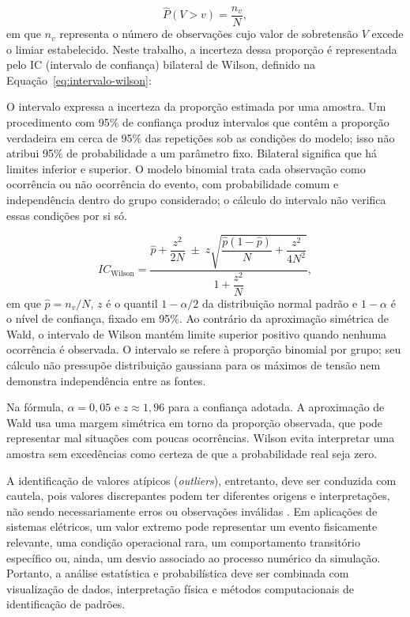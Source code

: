 \documentclass[
	12pt,				%
	openright,			%
	oneside,			%
	a4paper,			%
	chapter=TITLE,		%
	section=TITLE,		%
	subsection=TITLE,	%
	subsubsection=TITLE,%
	english,			%
	brazilian			%
	]{abntex2}
\theoremstyle{definition}
\begin{document}
\begin{equation}
\label{eq:excedencia-empirica}
\hat{P}(V > v)=\frac{n_v}{N},
\end{equation}
em que $n_v$ representa o número de observações cujo valor de sobretensão
$V$ excede o limiar estabelecido. Neste trabalho, a incerteza dessa
proporção é representada pelo IC (intervalo de confiança) bilateral de Wilson, definido na
Equação~\ref{eq:intervalo-wilson}:

O intervalo expressa a incerteza da proporção estimada por uma amostra.
Um procedimento com 95\% de confiança produz intervalos que contêm a
proporção verdadeira em cerca de 95\% das repetições sob as condições
do modelo; isso não atribui 95\% de probabilidade a um parâmetro fixo.
Bilateral significa que há limites inferior e superior. O modelo binomial
trata cada observação como ocorrência ou não ocorrência do evento,
com probabilidade comum e independência dentro do grupo considerado;
o cálculo do intervalo não verifica essas condições por si só.

\begin{equation}
\label{eq:intervalo-wilson}
IC_{\mathrm{Wilson}} =
\frac{\hat{p}+\dfrac{z^2}{2N}
\;\pm\; z\sqrt{\dfrac{\hat{p}(1-\hat{p})}{N}
+\dfrac{z^2}{4N^2}}}{1+\dfrac{z^2}{N}},
\end{equation}
em que $\hat{p}=n_v/N$, $z$ é o quantil $1-\alpha/2$ da distribuição
normal padrão e $1-\alpha$ é o nível de confiança, fixado em 95\%.
Ao contrário da aproximação simétrica de Wald, o intervalo de Wilson
mantém limite superior positivo quando nenhuma ocorrência é observada.
O intervalo se refere à proporção binomial por grupo; seu cálculo não
pressupõe distribuição gaussiana para os máximos de tensão nem demonstra
independência entre as fontes.

Na fórmula, $\alpha=0{,}05$ e $z\approx1{,}96$ para a confiança adotada.
A aproximação de Wald usa uma margem simétrica em torno da proporção
observada, que pode representar mal situações com poucas ocorrências.
Wilson evita interpretar uma amostra sem excedências como certeza de
que a probabilidade real seja zero.

A identificação de valores atípicos (\textit{outliers}), entretanto, deve ser conduzida com cautela, pois valores discrepantes podem ter diferentes origens e interpretações, não sendo necessariamente erros ou observações inválidas \cite{barnett1994}. Em aplicações de sistemas elétricos, um valor extremo pode representar um evento fisicamente relevante, uma condição operacional rara, um comportamento transitório específico ou, ainda, um desvio associado ao processo numérico da simulação. Portanto, a análise estatística e probabilística deve ser combinada com visualização de dados, interpretação física e métodos computacionais de identificação de padrões.
\end{document}
